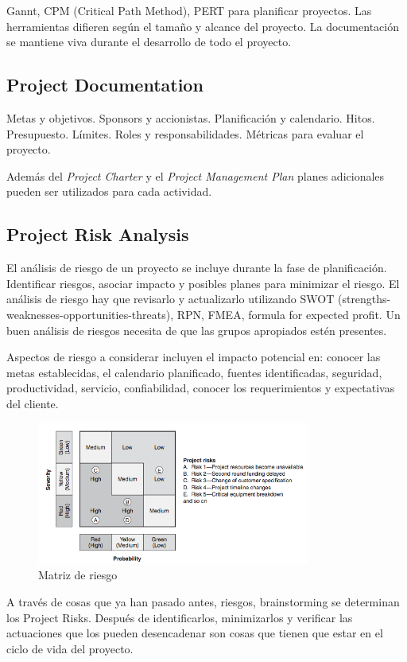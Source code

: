 \documentclass[]{article}
\begin{document}
Gannt, CPM (Critical Path Method), PERT para planificar proyectos.
Las herramientas difieren según el tamaño y alcance del proyecto. La documentación se mantiene viva durante el desarrollo de todo el proyecto.

\subsection{Project Documentation}

Metas y objetivos. Sponsors y accionistas. Planificación y calendario. Hitos. Presupuesto. Límites. Roles y responsabilidades. Métricas para evaluar el proyecto.

Además del \textit{Project Charter} y el \textit{Project Management Plan} planes adicionales pueden ser utilizados para cada actividad.

\subsection{Project Risk Analysis}

El análisis de riesgo de un proyecto se incluye durante la fase de planificación. Identificar riesgos, asociar impacto y posibles planes para minimizar el riesgo. El análisis de riesgo hay que revisarlo y actualizarlo utilizando SWOT (strengths-weaknesses-opportunities-threats), RPN, FMEA, formula for expected profit.
Un buen análisis de riesgos necesita de que las grupos apropiados estén presentes.

Aspectos de riesgo a considerar incluyen el impacto potencial en: conocer las metas establecidas, el calendario planificado, fuentes identificadas, seguridad, productividad, servicio, confiabilidad, conocer los requerimientos y expectativas del cliente.

\begin{figure}[ht!]
	\centering
	\includegraphics[width=90mm]{imagenes/RiskMatrix2.png}
	\caption{Matriz de riesgo}
	\label{fig:RiskMatrix2}
\end{figure}

A través de cosas que ya han pasado antes, riesgos, brainstorming se determinan los Project Risks. Después de identificarlos, minimizarlos y verificar las actuaciones que los pueden desencadenar son cosas que tienen que estar en el ciclo de vida del proyecto. 
\end{document}
